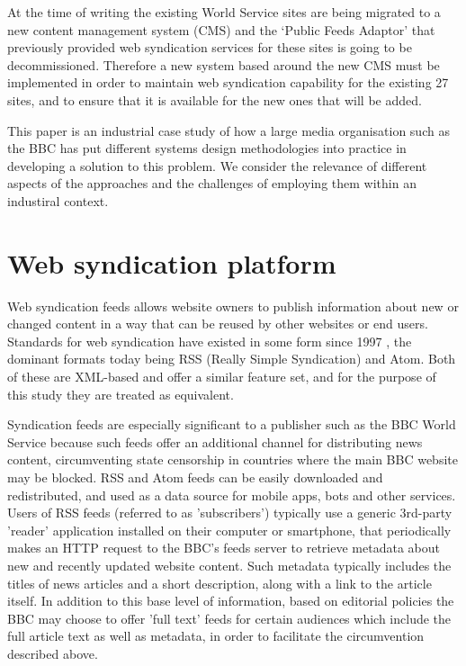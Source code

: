 \documentclass[runningheads,a4paper]{llncs}
\begin{document}
At the time of writing the existing World Service sites are being migrated to a new content management system (CMS) and the `Public Feeds Adaptor' that previously provided web syndication services for these sites is going to be decommissioned. Therefore a new system based around the new CMS must be implemented in order to maintain web syndication capability for the existing 27 sites, and to ensure that it is available for the new ones that will be added.

This paper is an industrial case study of how a large media organisation such as the BBC has put different systems design methodologies into practice in developing a solution to this problem. We consider the relevance of different aspects of the approaches and the challenges of employing them within an industiral context.


\section{Web syndication platform}

Web syndication feeds allows website owners to publish information about new or changed content in a way that can be reused by other websites or end users. Standards for web syndication have existed in some form since 1997 \cite{w3c1997}, the dominant formats today being RSS (Really Simple Syndication) and Atom. Both of these are XML-based and offer a similar feature set, and for the purpose of this study they are treated as equivalent.

Syndication feeds are especially significant to a publisher such as the BBC World Service because such feeds offer an additional channel for distributing news content, circumventing state censorship in countries where the main BBC website may be blocked. RSS and Atom feeds can be easily downloaded and redistributed, and used as a data source for mobile apps, bots and other services. Users of RSS feeds (referred to as 'subscribers') typically use a generic 3rd-party 'reader' application installed on their computer or smartphone, that periodically makes an HTTP request to the BBC's feeds server to retrieve metadata about new and recently updated website content. Such metadata typically includes the titles of news articles and a short description, along with a link to the article itself. In addition to this base level of information, based on editorial policies the BBC may choose to offer 'full text' feeds for certain audiences which include the full article text as well as metadata, in order to facilitate the circumvention described above.
\end{document}
